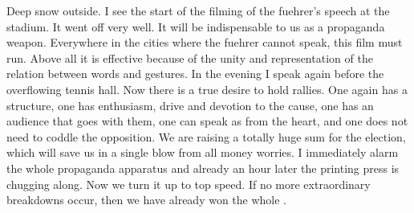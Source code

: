 Deep snow outside. I see the start of the filming of the fuehrer's speech at the stadium. It went off very well. It will be indispensable to us as a propaganda weapon. Everywhere in the cities where the fuehrer cannot speak, this film must run. Above all it is effective because of the unity and representation of the relation between words and gestures. In the evening I speak again before the overflowing tennis hall. Now there is a true desire to hold rallies. One again has a structure, one has enthusiasm, drive and devotion to the cause, one has an audience that goes with them, one can speak as from the heart, and one does not need to coddle the opposition. We are raising a totally huge sum for the election, which will save us in a single blow from all money worries. I immediately alarm the whole propaganda apparatus and already an hour later the printing press is chugging along. Now we turn it up to top speed. If no more extraordinary breakdowns occur, then we have already won the whole .

